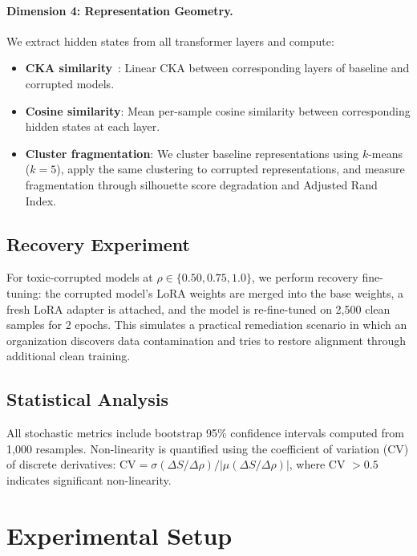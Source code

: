 \documentclass[conference]{IEEEtran}
\begin{document}
\paragraph{Dimension 4: Representation Geometry.}
We extract hidden states from all transformer layers and compute:
\begin{itemize}
    \item \textbf{CKA similarity}~\cite{kornblith2019similarity}: Linear CKA between corresponding layers of baseline and corrupted models.
    \item \textbf{Cosine similarity}: Mean per-sample cosine similarity between corresponding hidden states at each layer.
    \item \textbf{Cluster fragmentation}: We cluster baseline representations using $k$-means ($k{=}5$), apply the same clustering to corrupted representations, and measure fragmentation through silhouette score degradation and Adjusted Rand Index.
\end{itemize}

\subsection{Recovery Experiment}
\label{sec:recovery_method}

For toxic-corrupted models at $\rho \in \{0.50, 0.75, 1.0\}$, we perform recovery fine-tuning: the corrupted model's LoRA weights are merged into the base weights, a fresh LoRA adapter is attached, and the model is re-fine-tuned on 2,500 clean samples for 2 epochs. This simulates a practical remediation scenario in which an organization discovers data contamination and tries to restore alignment through additional clean training.

\subsection{Statistical Analysis}

All stochastic metrics include bootstrap 95\% confidence intervals computed from 1,000 resamples. Non-linearity is quantified using the coefficient of variation (CV) of discrete derivatives: $\text{CV} = \sigma(\Delta S / \Delta \rho) / |\mu(\Delta S / \Delta \rho)|$, where CV $> 0.5$ indicates significant non-linearity.

\section{Experimental Setup}
\label{sec:setup}
\end{document}

